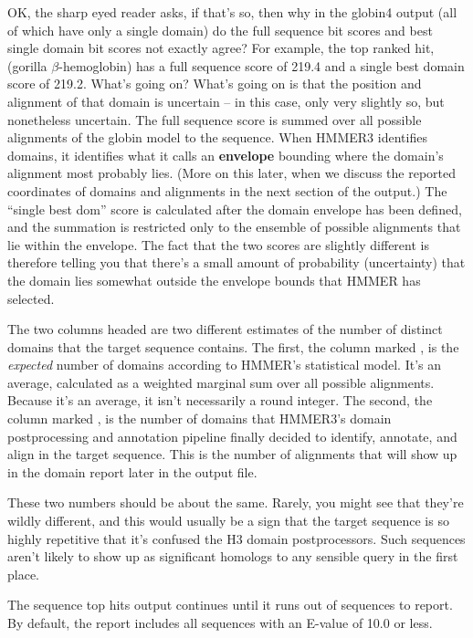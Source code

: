 OK, the sharp eyed reader asks, if that's so, then why in the globin4
output (all of which have only a single domain) do the full sequence
bit scores and best single domain bit scores not exactly agree? For
example, the top ranked hit,  (gorilla
$\beta$-hemoglobin) has a full sequence score of 219.4 and a single
best domain score of 219.2. What's going on? What's going on is that
the position and alignment of that domain is uncertain -- in this
case, only very slightly so, but nonetheless uncertain. The full
sequence score is summed over all possible alignments of the globin
model to the  sequence. When HMMER3 identifies
domains, it identifies what it calls an \textbf{envelope} bounding
where the domain's alignment most probably lies. (More on this later,
when we discuss the reported coordinates of domains and alignments in
the next section of the output.) The ``single best dom'' score is
calculated after the domain envelope has been defined, and the
summation is restricted only to the ensemble of possible alignments
that lie within the envelope. The fact that the two scores are
slightly different is therefore telling you that there's a small
amount of probability (uncertainty) that the domain lies somewhat
outside the envelope bounds that HMMER has selected.

The two columns headed  are two different estimates of
the number of distinct domains that the target sequence contains. The
first, the column marked , is the \emph{expected} number of
domains according to HMMER's statistical model. It's an average,
calculated as a weighted marginal sum over all possible
alignments. Because it's an average, it isn't necessarily a round
integer. The second, the column marked , is the number of
domains that HMMER3's domain postprocessing and annotation pipeline
finally decided to identify, annotate, and align in the target
sequence. This is the number of alignments that will show up in the
domain report later in the output file.

These two numbers should be about the same. Rarely, you might see that
they're wildly different, and this would usually be a sign that the
target sequence is so highly repetitive that it's confused the H3
domain postprocessors. Such sequences aren't likely to show up as
significant homologs to any sensible query in the first place.

The sequence top hits output continues until it runs out of sequences
to report. By default, the report includes all sequences with an
E-value of 10.0 or less. 

